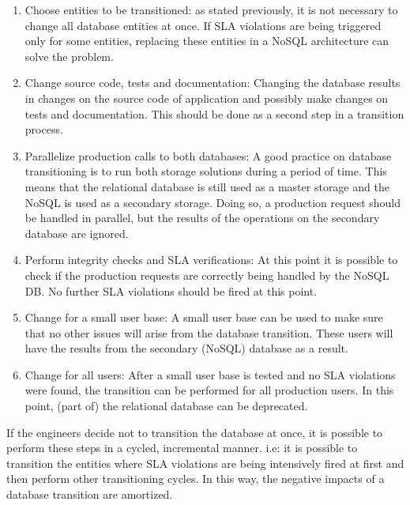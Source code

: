 \begin{enumerate}
\item{Choose entities to be transitioned: as stated previously, it is not necessary to change all database entities at once. If SLA violations are being triggered only for some entities, replacing these entities in a NoSQL architecture can solve the problem.}
\item{Change source code, tests and documentation: Changing the database results in changes on the source code of application and possibly make changes on tests and documentation. This should be done as a second step in a transition process. }
\item{Parallelize production calls to both databases: A good practice on database transitioning is to run both storage solutions during a period of time. This means that the relational database is still used as a master storage and the NoSQL is used as a secondary storage. Doing so, a production request should be handled in parallel, but the results of the operations on the secondary database are ignored.}
\item{Perform integrity checks and SLA verifications: At this point it is possible to check if the production requests are correctly being handled by the NoSQL DB. No further SLA violations should be fired at this point.}
\item{Change for a small user base: A small user base can be used to make sure that no other issues will arise from the database transition. These users will have the results from the secondary (NoSQL) database as a result.  }
\item{Change for all users: After a small user base is tested and no SLA violations were found, the transition can be performed for all production users. In this point, (part of) the relational database can be deprecated.}

\end{enumerate}

If the engineers decide not to transition the database at once, it is possible to perform these steps in a cycled, incremental manner. i.e: it is possible to transition the entities where SLA violations are being intensively fired at first and then perform other transitioning cycles. In this way, the negative impacts of a database transition are amortized.
